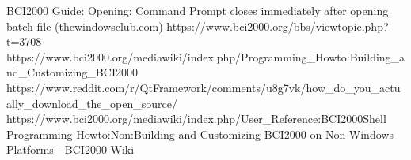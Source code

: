 \documentclass{article}
\begin{document}
BCI2000 Guide:
Opening: 
Command Prompt closes immediately after opening batch file (thewindowsclub.com)
https://www.bci2000.org/bbs/viewtopic.php?t=3708
https://www.bci2000.org/mediawiki/index.php/Programming_Howto:Building_and_Customizing_BCI2000
https://www.reddit.com/r/QtFramework/comments/u8g7vk/how_do_you_actually_download_the_open_source/
https://www.bci2000.org/mediawiki/index.php/User_Reference:BCI2000Shell
Programming Howto:Non:Building and Customizing BCI2000 on Non-Windows Platforms - BCI2000 Wiki
\end{document}
